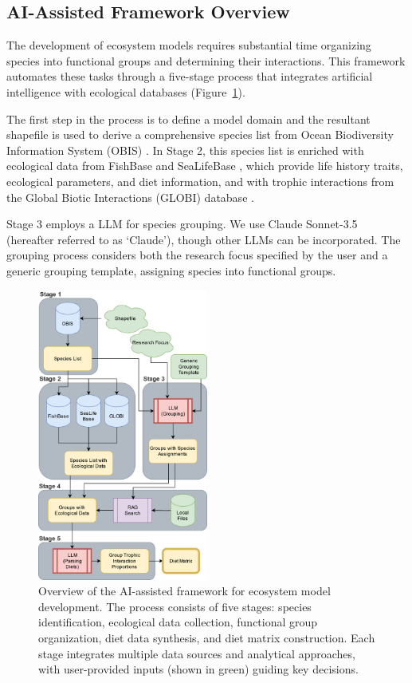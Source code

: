 \subsection{AI-Assisted Framework Overview}

The development of ecosystem models requires substantial time organizing species into functional groups and determining their interactions. This framework automates these tasks through a five-stage process that integrates artificial intelligence with ecological databases (Figure~\ref{fig:framework_overview}).

The first step in the process is to define a model domain and the resultant shapefile is used to derive a comprehensive species list from Ocean Biodiversity Information System (OBIS) \citep{Grassle1999}. In Stage 2, this species list is enriched with ecological data from FishBase and SeaLifeBase \citep{froese2010fishbase}, which provide life history traits, ecological parameters, and diet information, and with trophic interactions from the Global Biotic Interactions (GLOBI) database \citep{Poelen2014}.

Stage 3 employs a LLM for species grouping. We use Claude Sonnet-3.5 (hereafter referred to as `Claude')\citep{Anthropic2024}, though other LLMs can be incorporated. The grouping process considers both the research focus specified by the user and a generic grouping template, assigning species into functional groups.

\begin{figure}[htbp]
    \centering
    \includegraphics[width=0.5\textwidth]{figures/EwE_AI.drawio.png}
    \caption{Overview of the AI-assisted framework for ecosystem model development. The process consists of five stages: species identification, ecological data collection, functional group organization, diet data synthesis, and diet matrix construction. Each stage integrates multiple data sources and analytical approaches, with user-provided inputs (shown in green) guiding key decisions.}
    \label{fig:framework_overview}
\end{figure}

